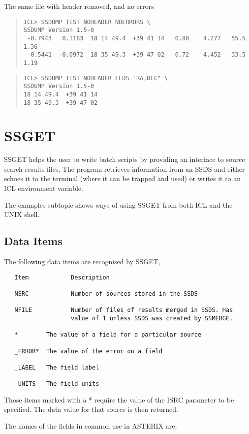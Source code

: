 \documentclass{book}
\renewcommand{\_}{{\tt\char'137}}     %
\begin{document}
The same file with header removed, and no errors
\begin{quote}\begin{verbatim}
ICL> SSDUMP TEST NOHEADER NOERRORS \
SSDUMP Version 1.5-0
 -0.7943   0.1183  18 14 49.4  +39 41 14   0.80    4.277   55.5   1.36
 -0.5441  -0.0972  18 35 49.3  +39 47 02   0.72    4.452   33.5   1.19
\end{verbatim}\end{quote}
\begin{quote}\begin{verbatim}
ICL> SSDUMP TEST NOHEADER FLDS="RA,DEC" \
SSDUMP Version 1.5-0
18 14 49.4  +39 41 14
18 35 49.3  +39 47 02
\end{verbatim}\end{quote}
\section{SSGET}
SSGET helps the user to write batch scripts by providing an interface to
source search results files. The program retrieves information
from an SSDS and either echoes it to the terminal (where it can be
trapped and used) or writes it to an ICL environment variable.
 
The examples subtopic shows ways of using SSGET from both ICL and
the UNIX shell.
 
\subsection{Data Items}
The following data items are recognised by SSGET,
\begin{verbatim}
   Item            Description
 
   NSRC            Number of sources stored in the SSDS
 
   NFILE           Number of files of results merged in SSDS. Has
                   value of 1 unless SSDS was created by SSMERGE.
 
   *        The value of a field for a particular source
 
   _ERROR*  The value of the error on a field
 
   _LABEL   The field label
 
   _UNITS   The field units
\end{verbatim}
Those items marked with a * require the value of the ISRC parameter
to be specified. The data value for that source is then returned.
 
The names of the fields in common use in ASTERIX are,
 
\end{document}
